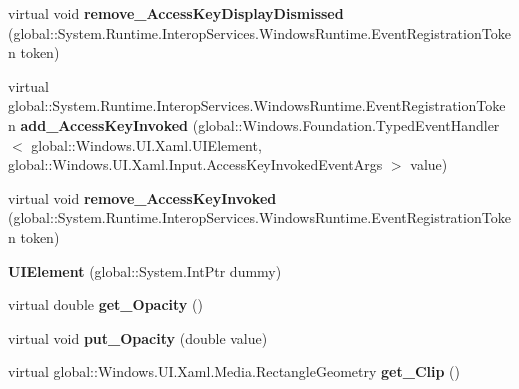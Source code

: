 \begin{DoxyCompactItemize}
\item 
\mbox{\label{class_windows_1_1_u_i_1_1_xaml_1_1_u_i_element_a7a81e564e7ffcf9a6e1afd9c0e1dacc7}} 
virtual void {\bfseries remove\+\_\+\+Access\+Key\+Display\+Dismissed} (global\+::\+System.\+Runtime.\+Interop\+Services.\+Windows\+Runtime.\+Event\+Registration\+Token token)
\item 
\mbox{\label{class_windows_1_1_u_i_1_1_xaml_1_1_u_i_element_a15ef4390a0a3d7f9f3319b6729fd010b}} 
virtual global\+::\+System.\+Runtime.\+Interop\+Services.\+Windows\+Runtime.\+Event\+Registration\+Token {\bfseries add\+\_\+\+Access\+Key\+Invoked} (global\+::\+Windows.\+Foundation.\+Typed\+Event\+Handler$<$ global\+::\+Windows.\+U\+I.\+Xaml.\+U\+I\+Element, global\+::\+Windows.\+U\+I.\+Xaml.\+Input.\+Access\+Key\+Invoked\+Event\+Args $>$ value)
\item 
\mbox{\label{class_windows_1_1_u_i_1_1_xaml_1_1_u_i_element_a5aad5be80c6fdb9b329d9bc29673cd07}} 
virtual void {\bfseries remove\+\_\+\+Access\+Key\+Invoked} (global\+::\+System.\+Runtime.\+Interop\+Services.\+Windows\+Runtime.\+Event\+Registration\+Token token)
\item 
\mbox{\label{class_windows_1_1_u_i_1_1_xaml_1_1_u_i_element_a27bd7accff1583615f084e98079b911a}} 
{\bfseries U\+I\+Element} (global\+::\+System.\+Int\+Ptr dummy)
\item 
\mbox{\label{class_windows_1_1_u_i_1_1_xaml_1_1_u_i_element_a0653356423d6b2e82584608c68968d68}} 
virtual double {\bfseries get\+\_\+\+Opacity} ()
\item 
\mbox{\label{class_windows_1_1_u_i_1_1_xaml_1_1_u_i_element_a1e20878dd2197db4f727f1ac47480c0a}} 
virtual void {\bfseries put\+\_\+\+Opacity} (double value)
\item 
\mbox{\label{class_windows_1_1_u_i_1_1_xaml_1_1_u_i_element_aadf0b8c76e7c0a2932dead3fd44e570c}} 
virtual global\+::\+Windows.\+U\+I.\+Xaml.\+Media.\+Rectangle\+Geometry {\bfseries get\+\_\+\+Clip} ()

\end{DoxyCompactItemize}
